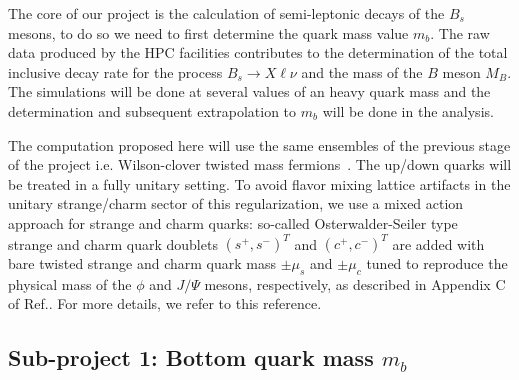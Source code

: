 \label{sec:proj}
The core of our project is the calculation of semi-leptonic decays of the $B_s$ mesons,
to do so we need to first determine the quark mass value $m_b$.
The raw data produced by the HPC facilities
contributes to the determination of
the total inclusive decay rate for the process $B_s \to X\ell\nu$
and the mass of the $B$ meson $M_B$. The simulations
will be done at several values of an heavy quark mass and the determination and
subsequent extrapolation to $m_b$ will be done in the analysis.

The computation proposed here will use the same ensembles of the previous stage of the project
i.e. Wilson-clover twisted
mass fermions~\cite{Alexandrou:2018egz}. The up/down quarks will be treated
in a fully unitary setting. To avoid flavor mixing lattice artifacts
in the unitary strange/charm sector of this regularization, we use a
mixed action approach for strange and charm quarks: so-called
Osterwalder-Seiler type~\cite{Frezzotti:2004wz} strange and charm quark doublets
$(s^+ , s^-)^T$ and $(c^+ , c^- )^T$ are added with bare
twisted strange and charm quark mass $\pm \mu_s$ and $\pm \mu_c$
tuned to reproduce the physical mass of the $\phi$ and $J/\Psi$
mesons, respectively, as described in Appendix C of
Ref.\cite{ExtendedTwistedMass:2022jpw}. For more details, we refer to
this reference.


\subsection{Sub-project 1: Bottom quark mass $m_b$}
\label{sec:mb}

